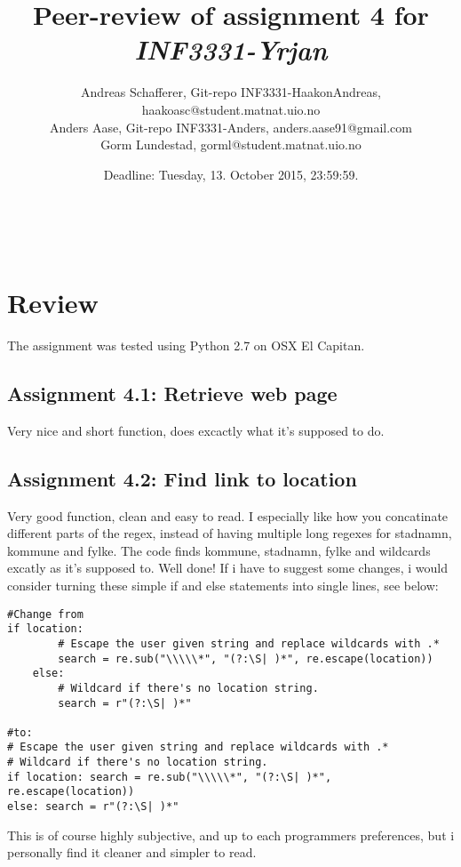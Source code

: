 \documentclass[a4paper]{article}
\title{Peer-review of assignment 4 for \textit{INF3331-Yrjan}}
\author{Andreas Schafferer, Git-repo INF3331-HaakonAndreas, {haakoasc@student.matnat.uio.no} \\
 		Anders Aase, Git-repo INF3331-Anders, {anders.aase91@gmail.com} \\
		Gorm Lundestad, {gorml@student.matnat.uio.no }}
\date{Deadline: Tuesday, 13. October 2015, 23:59:59.}
\begin{document}
\maketitle



\

\section{Review}\label{sec:review}

The assignment was tested using Python 2.7 on OSX El Capitan.

\subsection*{Assignment 4.1: Retrieve web page}
Very nice and short function, does excactly what it's supposed to do.


\subsection*{Assignment 4.2: Find link to location}
Very good function, clean and easy to read. I especially like how you concatinate different parts of the regex, instead of having multiple long regexes for stadnamn, kommune and fylke. \newline\newline
The code finds kommune, stadnamn, fylke and wildcards excatly as it's supposed to. Well done!\newline\newline
If i have to suggest some changes, i would consider turning these simple if and else statements into single lines, see below:

\begin{verbatim}
#Change from
if location:
        # Escape the user given string and replace wildcards with .*
        search = re.sub("\\\\\*", "(?:\S| )*", re.escape(location))
    else:
        # Wildcard if there's no location string.
        search = r"(?:\S| )*"

#to:
# Escape the user given string and replace wildcards with .*
# Wildcard if there's no location string.
if location: search = re.sub("\\\\\*", "(?:\S| )*", re.escape(location))
else: search = r"(?:\S| )*" 
\end{verbatim}
\newline
This is of course highly subjective, and up to each programmers preferences, but i personally find it cleaner and simpler to read.
\end{document}
